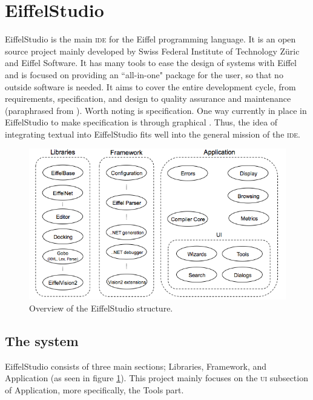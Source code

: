 \section{EiffelStudio}
EiffelStudio is the main \textsc{ide} for the Eiffel programming language. It is an open source project mainly developed by Swiss Federal Institute of Technology Z\"uric and Eiffel Software. It has many tools to ease the design of systems with Eiffel and is focused on providing an ``all-in-one" package for the user, so that no outside software is needed. It aims to cover the entire development cycle, from requirements, specification, and design to quality assurance and maintenance (paraphrased from \cite{mission}). Worth noting is specification. One way currently in place in EiffelStudio to make specification is through graphical \bon. Thus, the idea of integrating textual \bon{} into EiffelStudio fits well into the general mission of the \textsc{ide}.

\begin{figure}[h]
\centerline{
\includegraphics[scale=0.7]{images/eiffelstudio-structure-full.png}
}
\caption[Overview of the EiffelStudio structure]{Overview of the EiffelStudio structure.}
\label{fig:eiffelstudio_structure}
\end{figure}


\subsection{The system}
EiffelStudio consists of three main sections; Libraries, Framework, and Application (as seen in figure \ref{fig:eiffelstudio_structure}). This project mainly focuses on the \textsc{ui} subsection of Application, more specifically, the Tools part.

